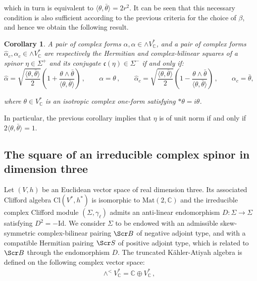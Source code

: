 \documentclass[10pt,a4paper,twoside,reqno]{amsart}
\theoremstyle{plain}
\newtheorem{cor}[thm]{Corollary}
\theoremstyle{definition}
\theoremstyle{remark}
\newcommand{\Mat}{\mathrm{Mat}}
\def\C{\mathbb{C}}
\def\Id{\mathrm{Id}}
\def\scB{\Scr B}
\def\scS{\Scr S}
\def\Cl{\mathrm{Cl}}
\newcommand{\escal}[1]{\langle#1\rangle}
\def\frc{\mathfrak{F}}
\def\frc{\mathfrak{c}}
\begin{document}
\noindent
which in turn is equivalent to $\escal{\theta,\bar{\theta}}=2r^2$.  It can be seen that this necessary condition is also sufficient according to the previous criteria for the choice of $\beta$, and hence we obtain the following result. 
\begin{cor}
A pair of complex forms $\widehat{\alpha}, \alpha \in \wedge V^{\ast}_{\mathbb{C}}$, and a pair of complex forms $\widehat{\alpha}_c, \alpha_c \in \wedge V^{\ast}_{\mathbb{C}}$ are respectively the Hermitian and complex-bilinear squares of a spinor $\eta\in \Sigma^{+}$ and its conjugate $\frc(\eta) \in \Sigma^{-}$ if and only if:
\begin{equation*}
\widehat{\alpha} = \sqrt{\frac{\escal{\theta,\bar\theta}}{2}} (1 +   \frac{\theta\wedge \bar{\theta}}{\escal{\theta,\bar\theta}})\, , \qquad \alpha = \theta\, , \qquad \widehat{\alpha}_c = \sqrt{\frac{\escal{\theta,\bar\theta}}{2}}(1 - \frac{\theta\wedge \bar{\theta}}{\escal{\theta,\bar\theta}})\, , \qquad \alpha_c = \bar\theta ,
\end{equation*}

\noindent
where $\theta \in V^{\ast}_{\mathbb{C}}$ is an isotropic complex one-form satisfying $\ast\theta = i\theta$.
\end{cor}

\noindent
In particular, the previous corollary implies that $\eta$ is of unit norm if and only if $2 \escal{\theta,\bar{\theta}} =1$.


\subsection{The square of an irreducible complex spinor in dimension three}


Let $(V,h)$ be an Euclidean vector space of real dimension three. Its associated Clifford algebra $\Cl(V^*,h^*)$ is isomorphic to $\Mat(2,\mathbb{C})$ and the irreducible complex Clifford module $(\Sigma,\gamma_\ell)$ admits an anti-linear endomorphism $D\colon \Sigma \to \Sigma$ satisfying $D^2=-\Id$. We consider $\Sigma$ to be endowed with an admissible skew-symmetric complex-bilinear pairing $\scB$ of negative adjoint type, and with a compatible Hermitian pairing $\scS$ of positive adjoint type, which is related to $\scB$ through the endomorphism $D$. The truncated Kähler-Atiyah algebra is defined on the following complex vector space: 
\begin{eqnarray*}
\wedge^<V^*_\C=\C\oplus V^*_\C\, ,
\end{eqnarray*}
\end{document}
